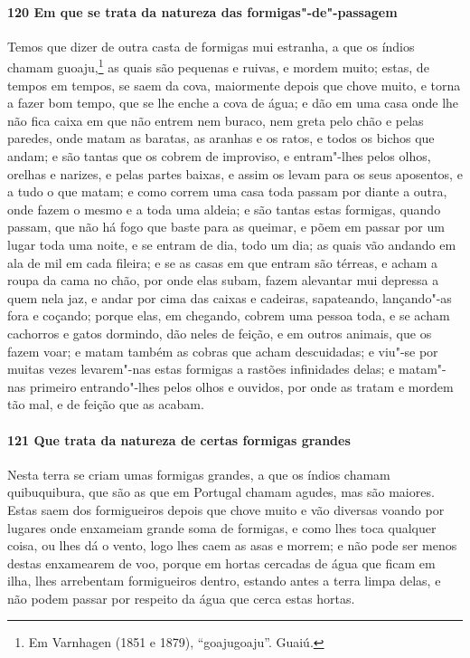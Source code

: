 \begin{linenumbers}
\paragraph{120 Em que se trata da natureza das formigas"-de"-passagem}\quad
Temos que dizer de outra casta de formigas mui estranha, a que os índios chamam
guoaju,\footnote{ Em Varnhagen (1851 e 1879), ``goajugoaju''. Guaiú.} as quais são
pequenas e ruivas, e mordem muito; estas, de tempos em tempos, se saem da cova, maiormente
depois que chove muito, e torna a fazer bom tempo, que se lhe enche a cova de água; e dão
em uma casa onde lhe não fica caixa em que não entrem nem buraco, nem greta pelo chão e
pelas paredes, onde matam as baratas, as aranhas e os ratos, e todos os bichos que andam;
e são tantas que os cobrem de improviso, e entram"-lhes pelos olhos, orelhas e narizes, e
pelas partes baixas, e assim os levam para os seus aposentos, e a tudo o que matam; e como
correm uma casa toda passam por diante a outra, onde fazem o mesmo e a toda uma aldeia; e
são tantas estas formigas, quando passam, que não há fogo que baste para as queimar, e
põem em passar por um lugar toda uma noite, e se entram de dia, todo um dia; as quais vão
andando em ala de mil em cada fileira; e se as casas em que entram são térreas, e acham a
roupa da cama no chão, por onde elas subam, fazem alevantar mui depressa a quem nela jaz,
e andar por cima das caixas e cadeiras, sapateando, lançando"-as fora e coçando; porque
elas, em chegando, cobrem uma pessoa toda, e se acham cachorros e gatos dormindo, dão
neles de feição, e em outros animais, que os fazem voar; e matam também as cobras que
acham descuidadas; e viu"-se por muitas vezes levarem"-nas estas formigas a rastões
infinidades delas; e matam"-nas primeiro entrando"-lhes pelos olhos e ouvidos, por onde as
tratam e mordem tão mal, e de feição que as acabam.

\paragraph{121 Que trata da natureza de certas formigas grandes}\quad
Nesta terra se criam umas formigas grandes, a que os índios chamam quibuquibura, que são
as que em Portugal chamam agudes, mas são maiores. Estas saem dos formigueiros depois que
chove muito e vão diversas voando por lugares onde enxameiam grande soma de formigas, e
como lhes toca qualquer coisa, ou lhes dá o vento, logo lhes caem as asas e morrem; e não
pode ser menos destas enxamearem de voo, porque em hortas cercadas de água que ficam em
ilha, lhes arrebentam formigueiros dentro, estando antes a terra limpa delas, e não podem
passar por respeito da água que cerca estas hortas.


\end{linenumbers}
